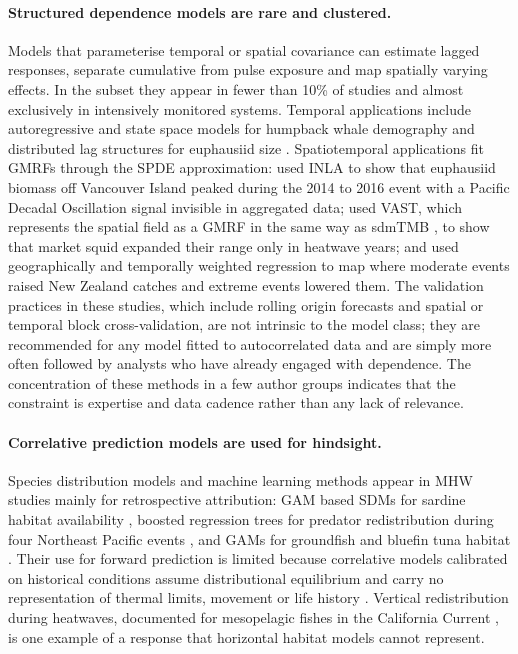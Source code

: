 \paragraph{Structured dependence models are rare and clustered.}
Models that parameterise temporal or spatial covariance can estimate lagged responses, separate cumulative from pulse exposure and map spatially varying effects. In the subset they appear in fewer than 10\% of studies and almost exclusively in intensively monitored systems. Temporal applications include autoregressive and state space models for humpback whale demography \citep{gabriele2022} and distributed lag structures for euphausiid size \citep{robertson2020}. Spatiotemporal applications fit GMRFs through the SPDE approximation: \citet{evans2023} used INLA to show that euphausiid biomass off Vancouver Island peaked during the 2014 to 2016 event with a Pacific Decadal Oscillation signal invisible in aggregated data; \citet{chasco2022} used VAST, which represents the spatial field as a GMRF in the same way as sdmTMB \citep{thorson2019,anderson2022}, to show that market squid expanded their range only in heatwave years; and \citet{lacheheb2024} used geographically and temporally weighted regression to map where moderate events raised New Zealand catches and extreme events lowered them. The validation practices in these studies, which include rolling origin forecasts and spatial or temporal block cross-validation, are not intrinsic to the model class; they are recommended for any model fitted to autocorrelated data \citep{roberts2017} and are simply more often followed by analysts who have already engaged with dependence. The concentration of these methods in a few author groups indicates that the constraint is expertise and data cadence rather than any lack of relevance.

\paragraph{Correlative prediction models are used for hindsight.}
Species distribution models and machine learning methods appear in MHW studies mainly for retrospective attribution: GAM based SDMs for sardine habitat availability \citep{muhling2025}, boosted regression trees for predator redistribution during four Northeast Pacific events \citep{welch2023}, and GAMs for groundfish and bluefin tuna habitat \citep{rooper2021,mcnicholas2024}. Their use for forward prediction is limited because correlative models calibrated on historical conditions assume distributional equilibrium and carry no representation of thermal limits, movement or life history \citep{welch2023,brodie2021}. Vertical redistribution during heatwaves, documented for mesopelagic fishes in the California Current \citep{iglesias2024}, is one example of a response that horizontal habitat models cannot represent.

